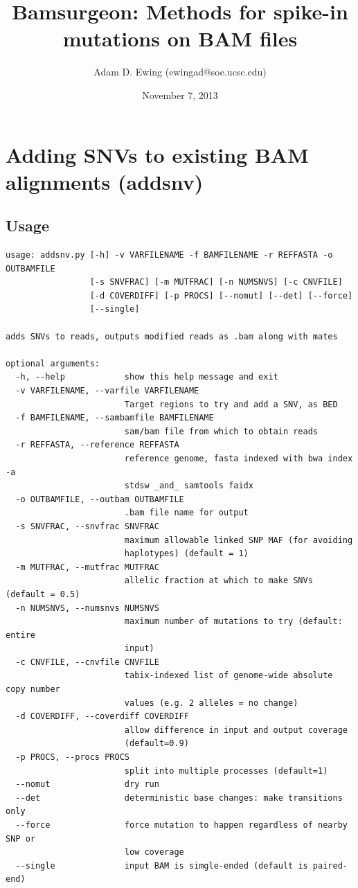 \documentclass[letterpaper,11pt]{article}
\title{Bamsurgeon: Methods for spike-in mutations on BAM files}
\author{Adam D. Ewing (ewingad@soe.ucsc.edu)}
\begin{document}
 \date{November 7, 2013}
 \maketitle

\section{Adding SNVs to existing BAM alignments (addsnv)}
\subsection{Usage}
\begin{verbatim}
usage: addsnv.py [-h] -v VARFILENAME -f BAMFILENAME -r REFFASTA -o OUTBAMFILE
                 [-s SNVFRAC] [-m MUTFRAC] [-n NUMSNVS] [-c CNVFILE]
                 [-d COVERDIFF] [-p PROCS] [--nomut] [--det] [--force]
                 [--single]

adds SNVs to reads, outputs modified reads as .bam along with mates

optional arguments:
  -h, --help            show this help message and exit
  -v VARFILENAME, --varfile VARFILENAME
                        Target regions to try and add a SNV, as BED
  -f BAMFILENAME, --sambamfile BAMFILENAME
                        sam/bam file from which to obtain reads
  -r REFFASTA, --reference REFFASTA
                        reference genome, fasta indexed with bwa index -a
                        stdsw _and_ samtools faidx
  -o OUTBAMFILE, --outbam OUTBAMFILE
                        .bam file name for output
  -s SNVFRAC, --snvfrac SNVFRAC
                        maximum allowable linked SNP MAF (for avoiding
                        haplotypes) (default = 1)
  -m MUTFRAC, --mutfrac MUTFRAC
                        allelic fraction at which to make SNVs (default = 0.5)
  -n NUMSNVS, --numsnvs NUMSNVS
                        maximum number of mutations to try (default: entire
                        input)
  -c CNVFILE, --cnvfile CNVFILE
                        tabix-indexed list of genome-wide absolute copy number
                        values (e.g. 2 alleles = no change)
  -d COVERDIFF, --coverdiff COVERDIFF
                        allow difference in input and output coverage
                        (default=0.9)
  -p PROCS, --procs PROCS
                        split into multiple processes (default=1)
  --nomut               dry run
  --det                 deterministic base changes: make transitions only
  --force               force mutation to happen regardless of nearby SNP or
                        low coverage
  --single              input BAM is simgle-ended (default is paired-end)

\end{verbatim}
\end{document}
